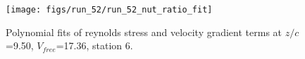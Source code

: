 \begin{figure}[H]
\centering
\texttt{[image: figs/run\_52/run\_52\_nut\_ratio\_fit]}
\caption{Polynomial fits of reynolds stress and velocity gradient terms at $z/c$=9.50, $V_{free}$=17.36, station 6.}
\label{fig:run_52_nut_ratio_fit}
\end{figure}


